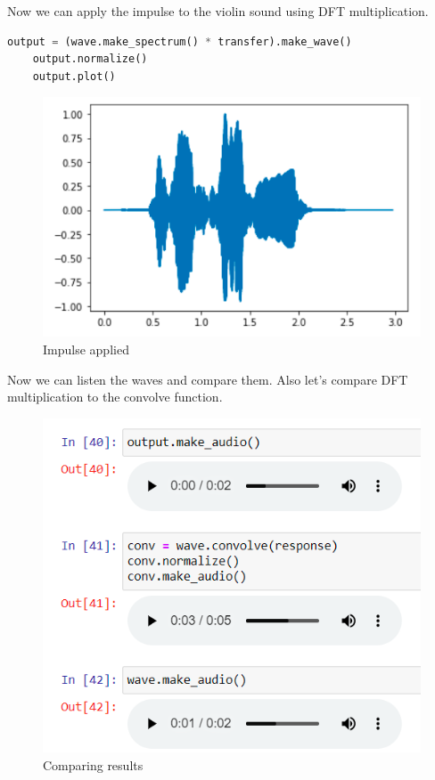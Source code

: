 \documentclass[a4paper]{article}
\begin{document}
        Now we can apply the impulse to the violin sound using DFT multiplication.
        
        \begin{lstlisting}[language=Python,caption=Applying the impulse,label={lst:part1_2}]
    output = (wave.make_spectrum() * transfer).make_wave()
    output.normalize()
    output.plot()
        \end{lstlisting}
        
        \begin{figure}[H]
            \centering
            \includegraphics[width=\textwidth]{img/p2_4.png}
            \caption{Impulse applied}
            \label{fig:part1_1_2}
        \end{figure}
        
        Now we can listen the waves and compare them. Also let's compare DFT multiplication to the convolve function.
        
        \begin{figure}[H]
            \centering
            \includegraphics[width=\textwidth]{img/p2_5.png}
            \caption{Comparing results}
            \label{fig:part1_1_2}
        \end{figure}
        
\end{document}
